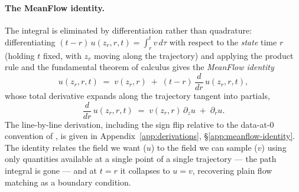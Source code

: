 \paragraph{The MeanFlow identity.} The integral is eliminated by differentiation rather than quadrature: differentiating $(t - r)\, u(z_r, r, t) = \int_r^t v\, d\tau$ with respect to the \emph{state} time $r$ (holding $t$ fixed, with $z_r$ moving along the trajectory) and applying the product rule and the fundamental theorem of calculus gives the \emph{MeanFlow identity}
\begin{equation}
  \boxed{\;u(z_r, r, t) \;=\; v(z_r, r) \;+\; (t - r)\, \frac{d}{dr}\, u(z_r, r, t),\;}
  \label{eq:meanflow-identity}
\end{equation}
whose total derivative expands along the trajectory tangent into partials,
\begin{equation}
  \frac{d}{dr}\, u(z_r, r, t) \;=\; v(z_r, r)\, \partial_z u \;+\; \partial_r u .
  \label{eq:meanflow-jvp}
\end{equation}
The line-by-line derivation, including the sign flip relative to the data-at-$0$ convention of \citet{geng2025meanflow}, is given in Appendix~\ref{app:derivations}, \S\ref{app:meanflow-identity}. The identity relates the field we want ($u$) to the field we can sample ($v$) using only quantities available at a single point of a single trajectory --- the path integral is gone --- and at $t = r$ it collapses to $u = v$, recovering plain flow matching as a boundary condition.

